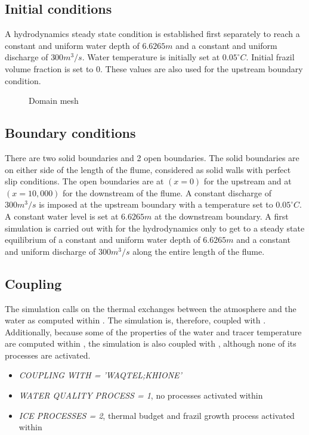 \subsection{Initial conditions}

A hydrodynamics steady state condition is established first separately to reach a constant and uniform water depth of $6.6265m$ and a constant and uniform discharge of $300m^3/s$.
Water temperature is initially set at $0.05^\circ C$. Initial frazil volume fraction is set to $0$. These values are also used for the upstream boundary condition.

\begin{figure}[H]
    \begin{center}
    \end{center}
    \caption{Domain mesh}
    \label{fig:growth_profile}
\end{figure}

\subsection{Boundary conditions}

There are two solid boundaries and 2 open boundaries.
The solid boundaries are on either side of the length of the flume, considered as solid walls with perfect slip conditions.
The open boundaries are at $(x=0)$ for the upstream and at $(x=10,000)$ for the downstream of the flume. A constant discharge of $300m^3/s$ is imposed at the upstream boundary with a temperature set to $0.05^{\circ} C$. A constant water level is set at $6.6265m$ at the downstream boundary.
A first simulation is carried out with for the hydrodynamics only to get to a steady state equilibrium of a constant and uniform water depth of $6.6265m$ and a constant and uniform discharge of $300m^3/s$ along the entire length of the flume.

\subsection{Coupling}

The simulation calls on the thermal exchanges between the atmosphere and the water as computed within \khione. The simulation is, therefore, coupled with \khione. Additionally, because some of the properties of the water and tracer temperature are computed within \waqtel, the simulation is also coupled with \waqtel, although none of its processes are activated.
\begin{itemize}
    \item\textit{COUPLING WITH = 'WAQTEL;KHIONE'}
    \item\textit{WATER QUALITY PROCESS = 1}, no processes activated within \waqtel
    \item\textit{ICE PROCESSES = 2}, thermal budget and frazil growth process activated within \khione
\end{itemize}

